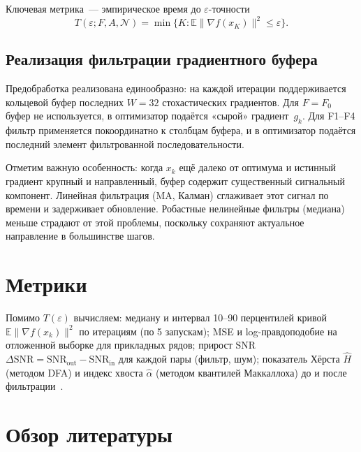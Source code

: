 \documentclass[conference]{IEEEtran}
\begin{document}
Ключевая метрика~--- эмпирическое время до $\varepsilon$-точности
\begin{equation}
  T(\varepsilon;F,A,\mathcal{N})
  = \min\bigl\{K : \mathbb{E}\|\nabla f(x_K)\|^2 \le \varepsilon\bigr\}.
  \label{eq:metric}
\end{equation}

\subsection{Реализация фильтрации градиентного буфера}

Предобработка реализована единообразно: на каждой итерации поддерживается
кольцевой буфер последних $W=32$ стохастических градиентов. Для $F=F_0$
буфер не используется, в оптимизатор подаётся «сырой» градиент~$g_k$.
Для F1--F4 фильтр применяется покоординатно к столбцам буфера, и в
оптимизатор подаётся последний элемент фильтрованной последовательности.

Отметим важную особенность: когда $x_k$ ещё далеко от оптимума и истинный
градиент крупный и направленный, буфер содержит существенный сигнальный
компонент. Линейная фильтрация (MA, Калман) сглаживает этот сигнал по
времени и задерживает обновление. Робастные нелинейные фильтры (медиана)
меньше страдают от этой проблемы, поскольку сохраняют актуальное
направление в большинстве шагов.

\section{Метрики}

Помимо $T(\varepsilon)$ вычисляем: медиану и интервал 10--90 перцентилей
кривой $\mathbb{E}\|\nabla f(x_k)\|^2$ по итерациям (по 5 запускам);
MSE и log-правдоподобие на отложенной выборке для прикладных рядов;
прирост SNR $\Delta\text{SNR} = \text{SNR}_\text{out} - \text{SNR}_\text{in}$
для каждой пары (фильтр, шум); показатель Хёрста $\hat{H}$ (методом DFA)
и индекс хвоста $\hat{\alpha}$ (методом квантилей Маккаллоха) до и после
фильтрации~\cite{donoho1994wavelets}.

\section{Обзор литературы}
\end{document}
